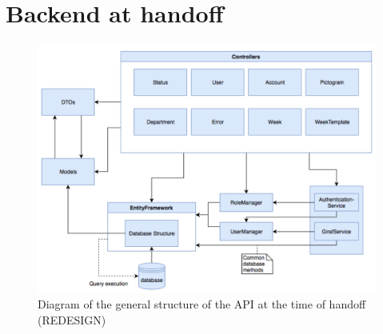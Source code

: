 \section{Backend at handoff}\label{app:state-at-handoff:backend}

\begin{figure}[h]
    \centering
    \caption{Diagram of the general structure of the API at the time of handoff (REDESIGN)}
    \includegraphics[width=1\textwidth]{figures/api_gen_struct_ho.png}
\end{figure}
